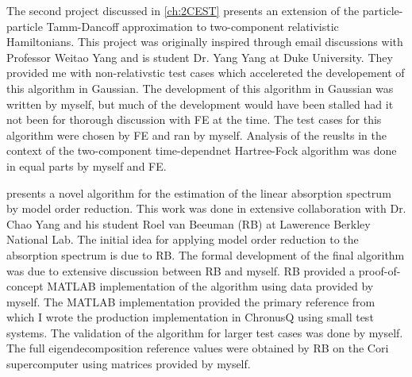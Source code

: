 {  The second project discussed in \cref{ch:2CEST} presents an extension of the particle-particle Tamm-Dancoff
  approximation to two-component relativistic Hamiltonians. This project was originally inspired through 
  email discussions with Professor Weitao Yang and is student Dr. Yang Yang at Duke University. They provided
  me with non-relativstic test cases which accelereted the developement of this algorithm in Gaussian. The
  development of this algorithm in Gaussian was written by myself, but much of the development would have 
  been stalled had it not been for thorough discussion with FE at the time. The test cases for
  this algorithm were chosen by FE and ran by myself. Analysis of the reuslts in the context of the
  two-component time-dependnet Hartree-Fock algorithm was done in equal parts by myself and FE.

   presents a novel algorithm for the estimation of the linear absorption spectrum
  by model order reduction. This work was done in extensive collaboration with Dr. Chao Yang 
  and his student Roel van Beeuman (RB) at Lawerence Berkley National Lab. The initial idea
  for applying model order reduction to the absorption spectrum is due to RB. The formal
  development of the final algorithm was due to extensive discussion between RB and myself.
  RB provided a proof-of-concept MATLAB implementation of the algorithm using data provided
  by myself. The MATLAB implementation provided the primary reference from which I wrote the 
  production implementation in ChronusQ using small test systems. The validation of the algorithm
  for larger test cases was done by myself. The full eigendecomposition reference values were
  obtained by RB on the Cori supercomputer using matrices provided by myself.
%
}


%
